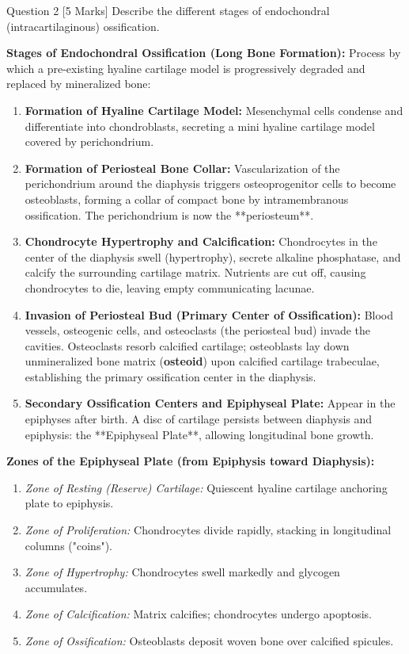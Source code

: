 \documentclass[11pt,a4paper]{article}
\begin{document}
\begin{qbox}{Question 2 [5 Marks]}
Describe the different stages of endochondral (intracartilaginous) ossification.
\end{qbox}

\begin{ansbox}
\textbf{Stages of Endochondral Ossification (Long Bone Formation):}
Process by which a pre-existing hyaline cartilage model is progressively degraded and replaced by mineralized bone:

\begin{enumerate}[leftmargin=*]
    \item \textbf{Formation of Hyaline Cartilage Model:} Mesenchymal cells condense and differentiate into chondroblasts, secreting a mini hyaline cartilage model covered by perichondrium.
    \item \textbf{Formation of Periosteal Bone Collar:} Vascularization of the perichondrium around the diaphysis triggers osteoprogenitor cells to become osteoblasts, forming a collar of compact bone by intramembranous ossification. The perichondrium is now the **periosteum**.
    \item \textbf{Chondrocyte Hypertrophy and Calcification:} Chondrocytes in the center of the diaphysis swell (hypertrophy), secrete alkaline phosphatase, and calcify the surrounding cartilage matrix. Nutrients are cut off, causing chondrocytes to die, leaving empty communicating lacunae.
    \item \textbf{Invasion of Periosteal Bud (Primary Center of Ossification):} Blood vessels, osteogenic cells, and osteoclasts (the periosteal bud) invade the cavities. Osteoclasts resorb calcified cartilage; osteoblasts lay down unmineralized bone matrix (\textbf{osteoid}) upon calcified cartilage trabeculae, establishing the primary ossification center in the diaphysis.
    \item \textbf{Secondary Ossification Centers and Epiphyseal Plate:} Appear in the epiphyses after birth. A disc of cartilage persists between diaphysis and epiphysis: the **Epiphyseal Plate**, allowing longitudinal bone growth.
\end{enumerate}

\textbf{Zones of the Epiphyseal Plate (from Epiphysis toward Diaphysis):}
\begin{enumerate}[leftmargin=*]
    \item \textit{Zone of Resting (Reserve) Cartilage:} Quiescent hyaline cartilage anchoring plate to epiphysis.
    \item \textit{Zone of Proliferation:} Chondrocytes divide rapidly, stacking in longitudinal columns ("coins").
    \item \textit{Zone of Hypertrophy:} Chondrocytes swell markedly and glycogen accumulates.
    \item \textit{Zone of Calcification:} Matrix calcifies; chondrocytes undergo apoptosis.
    \item \textit{Zone of Ossification:} Osteoblasts deposit woven bone over calcified spicules.
\end{enumerate}
\end{ansbox}
\end{document}
